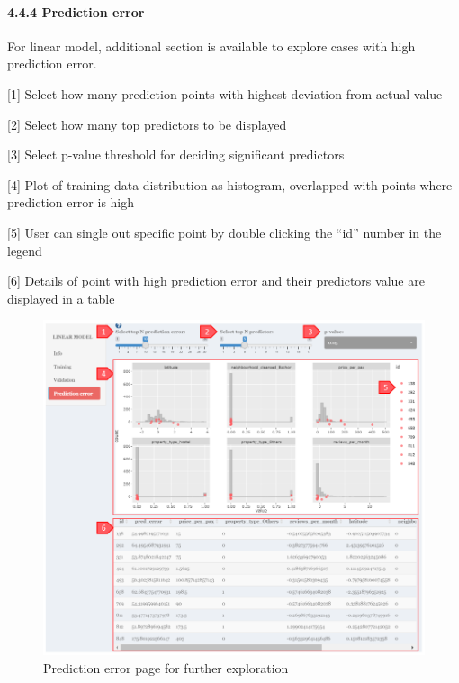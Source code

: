 \documentclass[
  12pt,
]{article}
\begin{document}
\hypertarget{prediction-error}{%
\paragraph{4.4.4 Prediction error}\label{prediction-error}}

For linear model, additional section is available to explore cases with
high prediction error.

{[}1{]} Select how many prediction points with highest deviation from
actual value

{[}2{]} Select how many top predictors to be displayed

{[}3{]} Select p-value threshold for deciding significant predictors

{[}4{]} Plot of training data distribution as histogram, overlapped with
points where prediction error is high

{[}5{]} User can single out specific point by double clicking the ``id''
number in the legend

{[}6{]} Details of point with high prediction error and their predictors
value are displayed in a table

\begin{figure}[H]

{\centering \includegraphics[width=0.95\linewidth]{images/mdltrain8} 

}

\caption{Prediction error page for further exploration}\label{fig:unnamed-chunk-25}
\end{figure}
\end{document}
